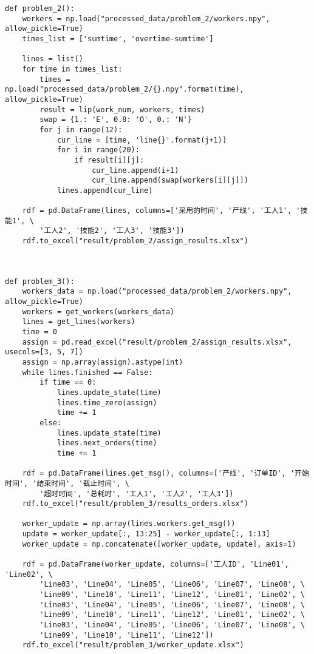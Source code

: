 \begin{lstlisting}[caption={问题解决}, label={lst:python}]
def problem_2():
    workers = np.load("processed_data/problem_2/workers.npy", allow_pickle=True)
    times_list = ['sumtime', 'overtime-sumtime']
    
    lines = list() 
    for time in times_list:
        times =  np.load("processed_data/problem_2/{}.npy".format(time), allow_pickle=True)
        result = lip(work_num, workers, times)
        swap = {1.: 'E', 0.8: 'O', 0.: 'N'}   
        for j in range(12):
            cur_line = [time, 'line{}'.format(j+1)]
            for i in range(20):
                if result[i][j]:
                    cur_line.append(i+1)
                    cur_line.append(swap[workers[i][j]])
            lines.append(cur_line)
            
    rdf = pd.DataFrame(lines, columns=['采用的时间', '产线', '工人1', '技能1', \
        '工人2', '技能2', '工人3', '技能3'])
    rdf.to_excel("result/problem_2/assign_results.xlsx")



def problem_3():
    workers_data = np.load("processed_data/problem_2/workers.npy", allow_pickle=True)
    workers = get_workers(workers_data)
    lines = get_lines(workers)
    time = 0
    assign = pd.read_excel("result/problem_2/assign_results.xlsx", usecols=[3, 5, 7])
    assign = np.array(assign).astype(int)
    while lines.finished == False:  
        if time == 0:
            lines.update_state(time)
            lines.time_zero(assign)
            time += 1
        else:          
            lines.update_state(time)
            lines.next_orders(time)
            time += 1 

    rdf = pd.DataFrame(lines.get_msg(), columns=['产线', '订单ID', '开始时间', '结束时间', '截止时间', \
        '超时时间', '总耗时', '工人1', '工人2', '工人3'])
    rdf.to_excel("result/problem_3/results_orders.xlsx")
    
    worker_update = np.array(lines.workers.get_msg())
    update = worker_update[:, 13:25] - worker_update[:, 1:13]
    worker_update = np.concatenate([worker_update, update], axis=1)
    
    rdf = pd.DataFrame(worker_update, columns=['工人ID', 'Line01', 'Line02', \
        'Line03', 'Line04', 'Line05', 'Line06', 'Line07', 'Line08', \
        'Line09', 'Line10', 'Line11', 'Line12', 'Line01', 'Line02', \
        'Line03', 'Line04', 'Line05', 'Line06', 'Line07', 'Line08', \
        'Line09', 'Line10', 'Line11', 'Line12', 'Line01', 'Line02', \
        'Line03', 'Line04', 'Line05', 'Line06', 'Line07', 'Line08', \
        'Line09', 'Line10', 'Line11', 'Line12'])
    rdf.to_excel("result/problem_3/worker_update.xlsx")
    

\end{lstlisting}
